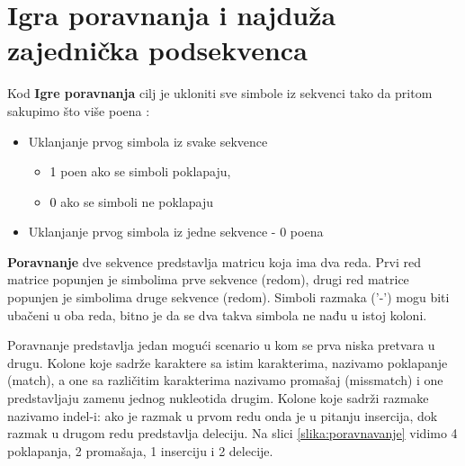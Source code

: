 \section{Igra poravnanja i najduža zajednička podsekvenca}

Kod \textbf{Igre poravnanja} cilj je ukloniti sve simbole iz sekvenci tako da pritom sakupimo što više poena :
\begin{itemize}
    \item Uklanjanje prvog simbola iz svake sekvence
         \begin{itemize}
         	\item \textcolor{black}{1} poen ako se simboli poklapaju,  \item\textcolor{black}{0} ako se simboli ne poklapaju
         \end{itemize}
    \item Uklanjanje prvog simbola iz jedne sekvence - 0 poena
\end{itemize}

\textbf{Poravnanje} dve sekvence predstavlja matricu koja ima dva reda. Prvi red matrice popunjen je simbolima prve sekvence (redom), drugi red matrice popunjen je simbolima druge sekvence (redom). Simboli razmaka ('-') mogu biti ubačeni u oba reda, bitno je da se dva takva simbola ne nađu u istoj koloni.

Poravnanje predstavlja jedan mogući scenario u kom se prva niska pretvara u drugu. Kolone koje sadrže karaktere sa istim karakterima, nazivamo poklapanje (match), a one sa različitim karakterima nazivamo promašaj (missmatch) i one predstavljaju zamenu jednog nukleotida drugim. Kolone koje sadrži razmake nazivamo indel-i: ako je razmak u prvom redu onda je u pitanju insercija, dok razmak u drugom redu predstavlja deleciju. Na slici \ref{slika:poravnavanje} vidimo 4 poklapanja, 2 promašaja, 1 inserciju i 2 delecije.

